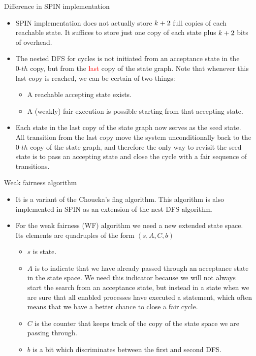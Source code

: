 \documentclass[12pt]{beamer}
\newcommand{\kk}{\mathnormal{k}}
\begin{document}
\begin{frame}{Difference in SPIN implementation}
	\begin{itemize}
		\item SPIN implementation does not actually store $\kk+2$ full copies of each reachable state. It suffices to store just one copy of each state plus $\kk+2$ bits of overhead.
		\item The nested DFS for cycles is not initiated from an acceptance state in the $0\text{-}th$ copy, but from the \textcolor{red}{last} copy of the state graph. Note that whenever this last copy is reached, we can be certain of two things:
		\begin{itemize}
			\item A reachable accepting state exists.
			\item A (weakly) fair execution is possible starting from that accepting state.
		\end{itemize}
		\item Each state in the last copy of the state graph now serves as the seed state. All transition from the last copy move the system unconditionally back to the $0\text{-}th$ copy of the state graph, and therefore the only way to revisit the seed state is to pass an accepting state and close the cycle with a fair sequence of transitions.
	\end{itemize}
\end{frame}

\begin{frame}{Weak fairness algorithm}
	\begin{itemize}
		\item It is a variant of the Choueka's flag algorithm. This algorithm is also implemented in SPIN as an extension of the nest DFS algorithm.
		\item For the weak fairness (WF) algorithm we need a new extended state space. Its elements are quadruples of the form $(s, A, C, b)$
		\begin{itemize}
			\item $s$ is state.
			\item $A$ is to indicate that we have already passed through an acceptance state in the state space. We need this indicator because we will not always start the search from an acceptance state, but instead in a state when we are sure that all enabled processes have executed a statement, which often means that we have a better chance to close a fair cycle.
			\item $C$ is the counter that keeps track of the copy of the state space we are passing through.
			\item $b$ is a bit which discriminates between the first and second DFS.
		\end{itemize}
	\end{itemize}
\end{frame}
\end{document}
